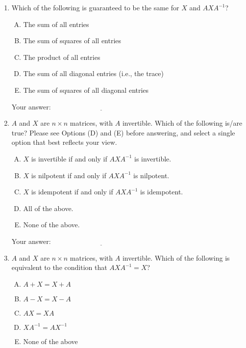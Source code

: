 \documentclass[10pt]{amsart}
\begin{document}
\begin{enumerate}
\item Which of the following is guaranteed to be the same for $X$ and
  $AXA^{-1}$?

  \begin{enumerate}[(A)]
  \item The sum of all entries
  \item The sum of squares of all entries
  \item The product of all entries
  \item The sum of all diagonal entries (i.e., the trace)
  \item The sum of squares of all diagonal entries
  \end{enumerate}

  \vspace{0.1in}
  Your answer: $\underline{\qquad\qquad\qquad\qquad\qquad\qquad\qquad}$
  \vspace{0.1in}

\item $A$ and $X$ are $n \times n$ matrices, with $A$
  invertible. Which of the following is/are true? Please see Options
  (D) and (E) before answering, and select a single option that best
  reflects your view.

  \begin{enumerate}[(A)]
  \item $X$ is invertible if and only if $AXA^{-1}$ is invertible.
  \item $X$ is nilpotent if and only if $AXA^{-1}$ is nilpotent.
  \item $X$ is idempotent if and only if $AXA^{-1}$ is idempotent.
  \item All of the above.
  \item None of the above.
  \end{enumerate}

  \vspace{0.1in}
  Your answer: $\underline{\qquad\qquad\qquad\qquad\qquad\qquad\qquad}$
  \vspace{0.1in}

\item $A$ and $X$ are $n \times n$ matrices, with $A$
  invertible. Which of the following is equivalent to the condition
  that $AXA^{-1} = X$?

  \begin{enumerate}[(A)]
  \item $A + X = X + A$
  \item $A - X = X - A$
  \item $AX = XA$
  \item $XA^{-1} = AX^{-1}$
  \item None of the above
  \end{enumerate}


\end{enumerate}
\end{document}
